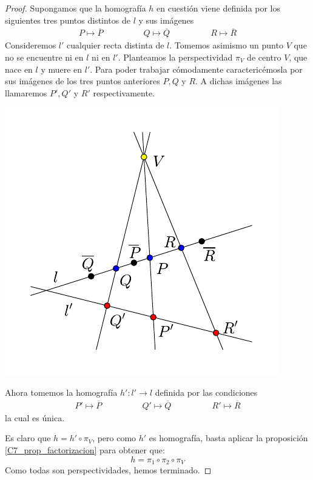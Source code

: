 \begin{proof}
	Supongamos que la homografía $h$ en cuestión viene definida por los siguientes tres puntos distintos de $l$ y sus imágenes
	\[\begin{array}{ccc}
	P\mapsto \overline{P}\qquad&\qquad
	Q\mapsto \overline{Q}\qquad&\qquad
	R\mapsto \overline{R}
	\end{array}\]
	Consideremos $l'$ cualquier recta distinta de $l$. Tomemos asimismo un punto $V$ que no se encuentre ni en $l$ ni en $l'$. Planteamos la perspectividad $\pi_V$ de centro $V$, que nace en $l$ y muere en $l'$. Para poder trabajar cómodamente caractericémosla por sus imágenes de los tres puntos anteriores $P,Q$ y $R$. A dichas imágenes las llamaremos $P',Q'$ y $R'$ respectivamente.
	
	\begin{center}
		\includegraphics[scale=.9]{Graficos/Desargues/perspectividad}
	\end{center}
	
	Ahora tomemos la homografía $h':l'\to l$ definida por las condiciones
	\[\begin{array}{ccc}
	P'\mapsto \overline{P}\qquad&\qquad
	Q'\mapsto \overline{Q}\qquad&\qquad
	R'\mapsto \overline{R}
	\end{array}\]
	la cual es única.
	
	Es claro que $h=h'\circ\pi_V$, pero como $h'$ es homografía, basta aplicar la proposición \ref{C7_prop_factorizacion} para obtener que:
	\[h=\pi_1\circ\pi_2\circ\pi_V\]
	Como todas son perspectividades, hemos terminado.
\end{proof}

